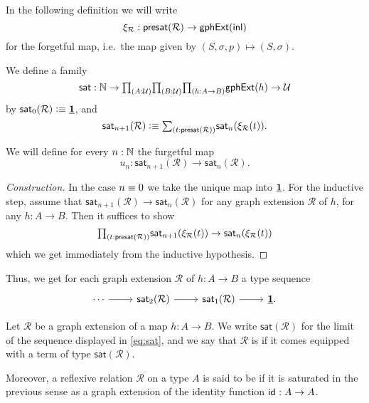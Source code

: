 In the following definition we will write 
\begin{equation*}
\xi_{\mathcal{R}}: \mathsf{presat}(\mathcal{R})\to \mathsf{gphExt}({\mathsf{inl}})
\end{equation*}
for the forgetful map, i.e.~the map given by $(S,\sigma,p)\mapsto (S,\sigma)$.

\begin{defn}
We define a family
\begin{equation*}
\mathsf{sat} : \N\to \prd{A:\UU}{B:\UU}{h:A\to B} \mathsf{gphExt}(h)\to \UU
\end{equation*}
by $\mathsf{sat}_0(\mathcal{R})\vcentcolon\equiv \underline{\mathbf{1}}$, and 
\begin{equation*}
\mathsf{sat}_{n+1}(\mathcal{R})\defeq \sm{t:\mathsf{presat}(\mathcal{R})} \mathsf{sat}_n(\xi_{\mathcal{R}}(t)).
\end{equation*}
\end{defn}

\begin{defn}
We will define for every $n:\mathbb{N}$ the furgetful map
\begin{equation*}
u_n:\mathsf{sat}_{n+1}(\mathcal{R})\to \mathsf{sat}_{n}(\mathcal{R}).
\end{equation*}
\end{defn}

\begin{proof}[Construction]
In the case $n\equiv 0$ we take the unique map into $\underline{\mathbf{1}}$.
For the inductive step, assume that $\mathsf{sat}_{n+1}(\mathcal{R})\to \mathsf{sat}_{n}(\mathcal{R})$ for any graph extension $\mathcal{R}$ of $h$, for any $h:A\to B$. 
Then it suffices to show
\begin{equation*}
\prd{t:\mathsf{presat}(\mathcal{R})} \mathsf{sat}_{n+1}(\xi_{\mathcal{R}}(t))\to \mathsf{sat}_{n}(\xi_{\mathcal{R}}(t))
\end{equation*}
which we get immediately from the inductive hypothesis.
\end{proof}

Thus, we get for each graph extension $\mathcal{R}$ of $h:A\to B$ a type sequence
\begin{equation}\label{eq:sat}
\begin{tikzcd}
\cdots \arrow[r] & \mathsf{sat}_{2}(\mathcal{R}) \arrow[r] & \mathsf{sat}_1(\mathcal{R}) \arrow[r] & \unit.
\end{tikzcd}
\end{equation}

\begin{defn}
Let $\mathcal{R}$ be a graph extension of a map $h:A\to B$. We write $\mathsf{sat}(\mathcal{R})$ for the limit of the sequence displayed in \cref{eq:sat}, and we say that $\mathcal{R}$ is  if it comes equipped with a term of type $\mathsf{sat}(\mathcal{R})$. 

Moreover, a reflexive relation $\mathcal{R}$ on a type $A$ is said to be  if it is saturated in the previous sense as a graph extension of the identity function $\mathsf{id}_{}:A\to A$.
\end{defn}

